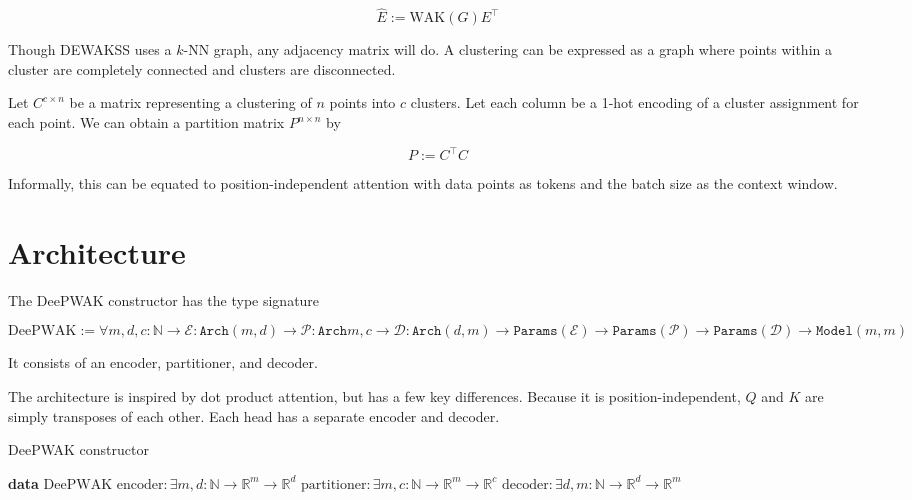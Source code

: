 \documentclass{article}
\begin{document}
\begin{equation}
\hat{E} := \mathrm{WAK}(G)E^\top
\end{equation}

Though DEWAKSS uses a $k$-NN graph, any adjacency matrix will do.
A clustering can be expressed as a graph where points within a cluster are completely connected and clusters are disconnected.

Let $C^{c \times n}$ be a matrix representing a clustering of $n$ points into $c$ clusters. Let each column be a 1-hot encoding of a cluster assignment for each point. We can obtain a partition matrix $P^{n \times n}$ by

\begin{equation}
  P := C^\top C
\end{equation}

Informally, this can be equated to position-independent attention with data points as tokens and the batch size as the context window.

\section{Architecture}

The DeePWAK constructor has the type signature

\begin{equation}
  \mathrm{DeePWAK} := \forall m,d,c :\mathbb{N} \to \mathcal{E} : \mathtt{Arch}(m,d) \to \mathcal{P} : \mathtt{Arch}{m,c} \to \mathcal{D} : \mathtt{Arch}(d,m) \to \mathtt{Params}(\mathcal{E}) \to \mathtt{Params}(\mathcal{P}) \to \mathtt{Params}(\mathcal{D}) \to \mathtt{Model}(m,m)
\end{equation}

It consists of an encoder, partitioner, and decoder.

The architecture is inspired by dot product attention, but has a few key differences. Because it is position-independent, $Q$ and $K$ are simply transposes of each other. Each head has a separate encoder and decoder. 

\begin{algorithm}
  \caption{DeePWAK constructor}\label{alg:cap}
  \begin{algorithmic}[1]
    \State \textbf{data} $\mathrm{DeePWAK}${
    \State $\mathrm{encoder} : \exists m,d : \mathbb{N} \to \mathbb{R}^m \to \mathbb{R}^d$
    \State $\mathrm{partitioner} : \exists m,c : \mathbb{N} \to \mathbb{R}^m \to \mathbb{R}^c$
    \State $\mathrm{decoder} : \exists d,m : \mathbb{N} \to \mathbb{R}^d \to \mathbb{R}^m$
    }
  \end{algorithmic}
\end{algorithm}
\end{document}
